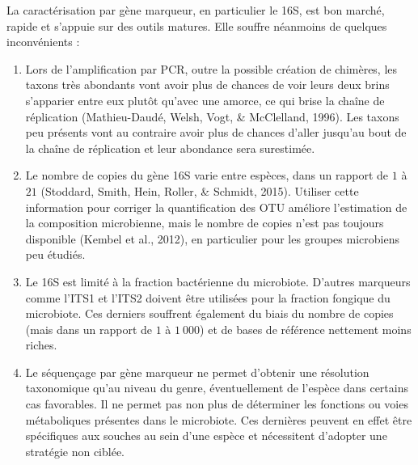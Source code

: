\documentclass[12pt,a4paper]{reedthesis}
\theoremstyle{definition}
\theoremstyle{definition}
\theoremstyle{definition}
\theoremstyle{remark}
\begin{document}
La caractérisation par gène marqueur, en particulier le 16S, est bon marché, rapide et s'appuie sur des outils matures. Elle souffre néanmoins de quelques inconvénients :
\begin{enumerate}
\def\labelenumi{\arabic{enumi}.}
\item
  Lors de l'amplification par PCR, outre la possible création de chimères, les taxons très abondants vont avoir plus de chances de voir leurs deux brins s'apparier entre eux plutôt qu'avec une amorce, ce qui brise la chaîne de réplication (Mathieu-Daudé, Welsh, Vogt, \& McClelland, 1996). Les taxons peu présents vont au contraire avoir plus de chances d'aller jusqu'au bout de la chaîne de réplication et leur abondance sera surestimée.
\item
  Le nombre de copies du gène 16S varie entre espèces, dans un rapport de \(1\) à \(21\) (Stoddard, Smith, Hein, Roller, \& Schmidt, 2015). Utiliser cette information pour corriger la quantification des OTU améliore l'estimation de la composition microbienne, mais le nombre de copies n'est pas toujours disponible (Kembel et al., 2012), en particulier pour les groupes microbiens peu étudiés.
\item
  Le 16S est limité à la fraction bactérienne du microbiote. D'autres marqueurs comme l'ITS1 et l'ITS2 doivent être utilisées pour la fraction fongique du microbiote. Ces derniers souffrent également du biais du nombre de copies (mais dans un rapport de \(1\) à \(1~000\)) et de bases de référence nettement moins riches.
\item
  Le séquençage par gène marqueur ne permet d'obtenir une résolution taxonomique qu'au niveau du genre, éventuellement de l'espèce dans certains cas favorables. Il ne permet pas non plus de déterminer les fonctions ou voies métaboliques présentes dans le microbiote. Ces dernières peuvent en effet être spécifiques aux souches au sein d'une espèce et nécessitent d'adopter une stratégie non ciblée.
\end{enumerate}
\end{document}
